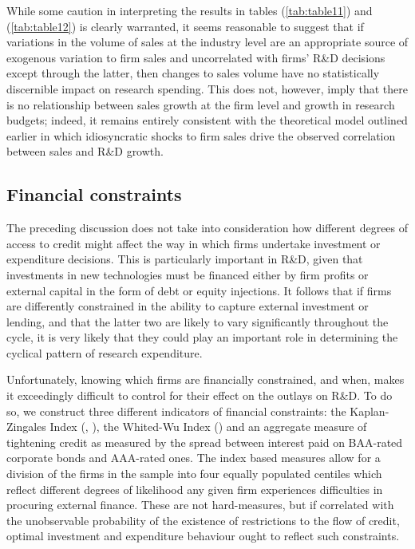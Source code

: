 \documentclass{_latex/house}
\begin{document}
While some caution in interpreting the results in tables (\ref{tab:table11}) and (\ref{tab:table12}) is clearly warranted, it seems reasonable to suggest that if variations in the volume of sales at the industry level are an appropriate source of exogenous variation to firm sales and uncorrelated with firms' R\&D decisions except through the latter, then changes to sales volume have no statistically discernible impact on research spending. This does not, however, imply that there is no relationship between sales growth at the firm level and growth in research budgets; indeed, it remains entirely consistent with the theoretical model outlined earlier in which idiosyncratic shocks to firm sales drive the observed correlation between sales and R\&D growth. 

\subsection{Financial constraints} \label{compustatfinancial}
The preceding discussion does not take into consideration how different degrees of access to credit might affect the way in which firms undertake investment or expenditure decisions. This is particularly important in R\&D, given that investments in new technologies must be financed either by firm profits or external capital in the form of debt or equity injections. It follows that if firms are differently constrained in the ability to capture external investment or lending, and that the latter two are likely to vary significantly throughout the cycle, it is very likely that they could play an important role in determining the cyclical pattern of research expenditure.

Unfortunately, knowing which firms are financially constrained, and when, makes it exceedingly difficult to control for their effect on the outlays on R\&D. To do so, we construct three different indicators of financial constraints: the Kaplan-Zingales Index (\cite{Kaplan01021997}, \cite{RePEc:oup:rfinst:v:14:y:2001:i:2:p:529-54}), the Whited-Wu Index (\cite{RePEc:oup:rfinst:v:19:y:2006:i:2:p:531-559}) and an aggregate measure of tightening credit as measured by the spread between interest paid on BAA-rated corporate bonds and AAA-rated ones.  The index based measures allow for a division of the firms in the sample into four equally populated centiles which reflect different degrees of likelihood any given firm experiences difficulties in procuring external finance. These are not hard-measures, but if correlated with the unobservable probability of the existence of restrictions to the flow of credit, optimal investment and expenditure behaviour ought to reflect such constraints.
\end{document}
